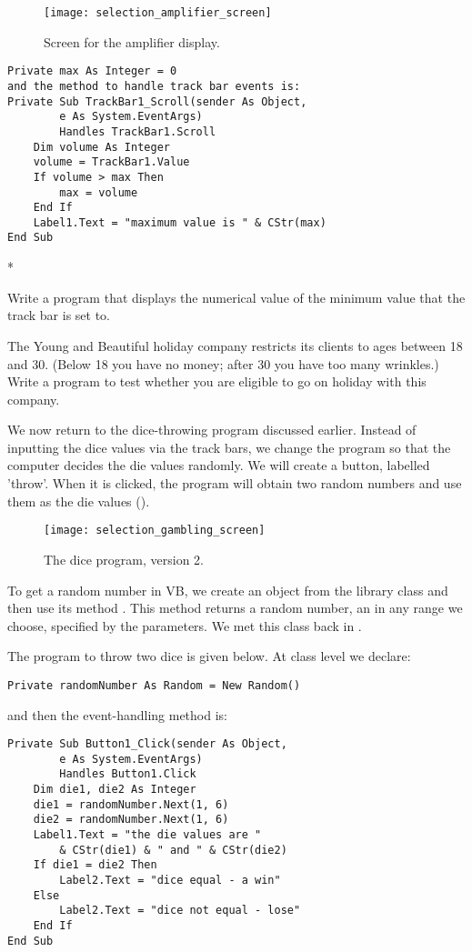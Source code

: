 		
			\begin{figure}[th]
				\centering
				\texttt{[image: selection\_amplifier\_screen]}
				\caption{Screen for the amplifier display.}
				\label{fig:selection_amplifier_screen}
			\end{figure}


		\begin{lstlisting}
Private max As Integer = 0
and the method to handle track bar events is:
Private Sub TrackBar1_Scroll(sender As Object,
		e As System.EventArgs)
		Handles TrackBar1.Scroll
	Dim volume As Integer
	volume = TrackBar1.Value
	If volume > max Then
		max = volume
	End If
	Label1.Text = "maximum value is " & CStr(max)
End Sub
		\end{lstlisting}

		\begin{stqb}*
			\begin{STQ}
				\item	Write a program that displays the numerical value of the minimum value that the track bar is set to.
				\item The Young and Beautiful holiday company restricts its clients to ages between 18 and 30. (Below 18 you have no money; after 30 you have too many wrinkles.) Write a program to test whether you are eligible to go on holiday with this company.
			\end{STQ}
		\end{stqb}

		We now return to the dice-throwing program discussed earlier. Instead of inputting the dice values via the track bars, we change the program so that the computer decides the die values randomly. We will create a button, labelled 'throw'. When it is clicked, the program will obtain two random numbers and use them as the die values ().

			\begin{figure}[th]
				\centering
				\texttt{[image: selection\_gambling\_screen]}
				\caption{The dice program, version 2.}
				\label{fig:selection_gambling_screen}
			\end{figure}


		To get a random number in VB, we create an object from the library class  and then use its method . This method returns a random number, an  in any range we choose, specified by the parameters. We met this class back in .
		
		The program to throw two dice is given below. At class level we declare:
		\begin{lstlisting}
Private randomNumber As Random = New Random()
		\end{lstlisting}
		and then the event-handling method is:
		\begin{lstlisting}
Private Sub Button1_Click(sender As Object,
		e As System.EventArgs)
		Handles Button1.Click
	Dim die1, die2 As Integer
	die1 = randomNumber.Next(1, 6)
	die2 = randomNumber.Next(1, 6)
	Label1.Text = "the die values are "
		& CStr(die1) & " and " & CStr(die2)
	If die1 = die2 Then
		Label2.Text = "dice equal - a win"
	Else
		Label2.Text = "dice not equal - lose"
	End If
End Sub
		\end{lstlisting}


